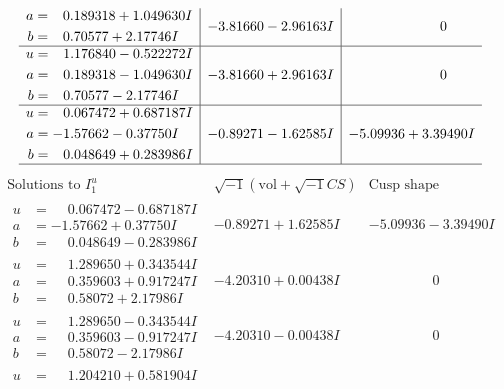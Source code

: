 \documentclass[1p]{elsarticle_modified}
\theoremstyle{definition}
\newcommand{\I}{\sqrt{-1}}
\begin{document}
$$\begin{array}{c|c|c}
\begin{aligned}
a &= \phantom{-}0.189318 + 1.049630 I \\
b &= \phantom{-}0.70577 + 2.17746 I\end{aligned}
 & -3.81660 - 2.96163 I & \phantom{-0.000000 } 0 \\ \hline\begin{aligned}
u &= \phantom{-}1.176840 - 0.522272 I \\
a &= \phantom{-}0.189318 - 1.049630 I \\
b &= \phantom{-}0.70577 - 2.17746 I\end{aligned}
 & -3.81660 + 2.96163 I & \phantom{-0.000000 } 0 \\ \hline\begin{aligned}
u &= \phantom{-}0.067472 + 0.687187 I \\
a &= -1.57662 - 0.37750 I \\
b &= \phantom{-}0.048649 + 0.283986 I\end{aligned}
 & -0.89271 - 1.62585 I & -5.09936 + 3.39490 I\\
 \hline 
 \end{array}$$\newpage$$\begin{array}{c|c|c}  
\text{Solutions to }I^u_{1}& \I (\text{vol} + \sqrt{-1}CS) & \text{Cusp shape}\\
 \hline 
\begin{aligned}
u &= \phantom{-}0.067472 - 0.687187 I \\
a &= -1.57662 + 0.37750 I \\
b &= \phantom{-}0.048649 - 0.283986 I\end{aligned}
 & -0.89271 + 1.62585 I & -5.09936 - 3.39490 I \\ \hline\begin{aligned}
u &= \phantom{-}1.289650 + 0.343544 I \\
a &= \phantom{-}0.359603 + 0.917247 I \\
b &= \phantom{-}0.58072 + 2.17986 I\end{aligned}
 & -4.20310 + 0.00438 I & \phantom{-0.000000 } 0 \\ \hline\begin{aligned}
u &= \phantom{-}1.289650 - 0.343544 I \\
a &= \phantom{-}0.359603 - 0.917247 I \\
b &= \phantom{-}0.58072 - 2.17986 I\end{aligned}
 & -4.20310 - 0.00438 I & \phantom{-0.000000 } 0 \\ \hline\begin{aligned}
u &= \phantom{-}1.204210 + 0.581904 I \\

\end{aligned}
\end{array}$$
\end{document}
